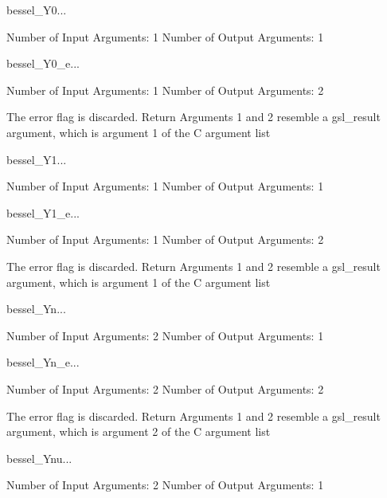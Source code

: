 \begin{funcdesc}{bessel_Y0}{...}

    Number of Input  Arguments:  1
    Number of Output Arguments:  1
\end{funcdesc}

\begin{funcdesc}{bessel_Y0_e}{...}

    Number of Input  Arguments:  1
    Number of Output Arguments:  2

The error flag is discarded.
Return Arguments 1 and 2 resemble a gsl_result argument,
	which is  argument 1 of the C argument list

\end{funcdesc}

\begin{funcdesc}{bessel_Y1}{...}

    Number of Input  Arguments:  1
    Number of Output Arguments:  1
\end{funcdesc}

\begin{funcdesc}{bessel_Y1_e}{...}

    Number of Input  Arguments:  1
    Number of Output Arguments:  2

The error flag is discarded.
Return Arguments 1 and 2 resemble a gsl_result argument,
	which is  argument 1 of the C argument list

\end{funcdesc}

\begin{funcdesc}{bessel_Yn}{...}

    Number of Input  Arguments:  2
    Number of Output Arguments:  1
\end{funcdesc}

\begin{funcdesc}{bessel_Yn_e}{...}

    Number of Input  Arguments:  2
    Number of Output Arguments:  2

The error flag is discarded.
Return Arguments 1 and 2 resemble a gsl_result argument,
	which is  argument 2 of the C argument list

\end{funcdesc}

\begin{funcdesc}{bessel_Ynu}{...}

    Number of Input  Arguments:  2
    Number of Output Arguments:  1
\end{funcdesc}

